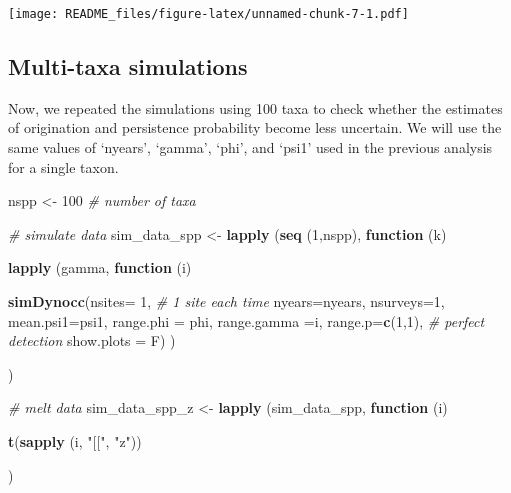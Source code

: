 \documentclass[
]{article}
\newenvironment{Shaded}{\begin{snugshade}}{\end{snugshade}}
\newcommand{\AttributeTok}[1]{\textcolor[rgb]{0.13,0.29,0.53}{#1}}
\newcommand{\CommentTok}[1]{\textcolor[rgb]{0.56,0.35,0.01}{\textit{#1}}}
\newcommand{\ControlFlowTok}[1]{\textcolor[rgb]{0.13,0.29,0.53}{\textbf{#1}}}
\newcommand{\DecValTok}[1]{\textcolor[rgb]{0.00,0.00,0.81}{#1}}
\newcommand{\FunctionTok}[1]{\textcolor[rgb]{0.13,0.29,0.53}{\textbf{#1}}}
\newcommand{\NormalTok}[1]{#1}
\newcommand{\OtherTok}[1]{\textcolor[rgb]{0.56,0.35,0.01}{#1}}
\newcommand{\StringTok}[1]{\textcolor[rgb]{0.31,0.60,0.02}{#1}}
\begin{document}
\texttt{[image: README\_files/figure-latex/unnamed-chunk-7-1.pdf]}

\hypertarget{multi-taxa-simulations}{%
\subsection{Multi-taxa simulations}\label{multi-taxa-simulations}}

Now, we repeated the simulations using 100 taxa to check whether the
estimates of origination and persistence probability become less
uncertain. We will use the same values of `nyears', `gamma', `phi', and
`psi1' used in the previous analysis for a single taxon.

\begin{Shaded}
\begin{Highlighting}[]
\NormalTok{nspp }\OtherTok{\textless{}{-}} \DecValTok{100} \CommentTok{\# number of taxa}

\CommentTok{\# simulate data}
\NormalTok{sim\_data\_spp }\OtherTok{\textless{}{-}} \FunctionTok{lapply}\NormalTok{ (}\FunctionTok{seq}\NormalTok{ (}\DecValTok{1}\NormalTok{,nspp), }\ControlFlowTok{function}\NormalTok{ (k)}
  
      \FunctionTok{lapply}\NormalTok{ (gamma, }\ControlFlowTok{function}\NormalTok{ (i) }
  
  
            \FunctionTok{simDynocc}\NormalTok{(}\AttributeTok{nsites=} \DecValTok{1}\NormalTok{, }\CommentTok{\# 1 site each time}
                      \AttributeTok{nyears=}\NormalTok{nyears,}
                      \AttributeTok{nsurveys=}\DecValTok{1}\NormalTok{,}
                      \AttributeTok{mean.psi1=}\NormalTok{psi1,}
                      \AttributeTok{range.phi =}\NormalTok{ phi,}
                      \AttributeTok{range.gamma =}\NormalTok{i,}
                      \AttributeTok{range.p=}\FunctionTok{c}\NormalTok{(}\DecValTok{1}\NormalTok{,}\DecValTok{1}\NormalTok{), }\CommentTok{\# perfect detection}
                      \AttributeTok{show.plots =}\NormalTok{ F)}
\NormalTok{            )}

\NormalTok{)}

\CommentTok{\# melt data}
\NormalTok{sim\_data\_spp\_z }\OtherTok{\textless{}{-}} \FunctionTok{lapply}\NormalTok{ (sim\_data\_spp, }\ControlFlowTok{function}\NormalTok{ (i)}

  \FunctionTok{t}\NormalTok{(}\FunctionTok{sapply}\NormalTok{ (i, }\StringTok{"[["}\NormalTok{, }\StringTok{"z"}\NormalTok{))}
  
\NormalTok{  )}
\end{Highlighting}
\end{Shaded}
\end{document}
